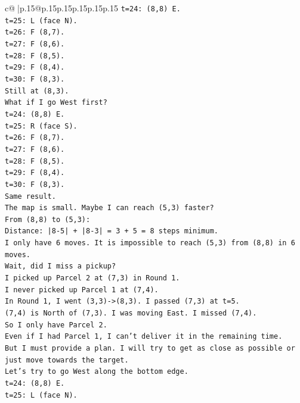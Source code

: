 \documentclass{article}
\begin{document}
{\begin{supertabular}{c@{$\;$}|p{.15\linewidth}@{}p{.15\linewidth}p{.15\linewidth}p{.15\linewidth}p{.15\linewidth}p{.15\linewidth}}
{{{\texttt{t=24: (8,8) E.} \\
\texttt{t=25: L (face N).} \\
\texttt{t=26: F (8,7).} \\
\texttt{t=27: F (8,6).} \\
\texttt{t=28: F (8,5).} \\
\texttt{t=29: F (8,4).} \\
\texttt{t=30: F (8,3).} \\
\texttt{Still at (8,3).} \\
\texttt{What if I go West first?} \\
\texttt{t=24: (8,8) E.} \\
\texttt{t=25: R (face S).} \\
\texttt{t=26: F (8,7).} \\
\texttt{t=27: F (8,6).} \\
\texttt{t=28: F (8,5).} \\
\texttt{t=29: F (8,4).} \\
\texttt{t=30: F (8,3).} \\
\texttt{Same result.} \\
\texttt{The map is small. Maybe I can reach (5,3) faster?} \\
\texttt{From (8,8) to (5,3):} \\
\texttt{Distance: |8{-}5| + |8{-}3| = 3 + 5 = 8 steps minimum.} \\
\texttt{I only have 6 moves. It is impossible to reach (5,3) from (8,8) in 6 moves.} \\
\texttt{Wait, did I miss a pickup?} \\
\texttt{I picked up Parcel 2 at (7,3) in Round 1.} \\
\texttt{I never picked up Parcel 1 at (7,4).} \\
\texttt{In Round 1, I went (3,3){-}>(8,3). I passed (7,3) at t=5.} \\
\texttt{(7,4) is North of (7,3). I was moving East. I missed (7,4).} \\
\texttt{So I only have Parcel 2.} \\
\texttt{Even if I had Parcel 1, I can't deliver it in the remaining time.} \\
\texttt{But I must provide a plan. I will try to get as close as possible or just move towards the target.} \\
\texttt{Let's try to go West along the bottom edge.} \\
\texttt{t=24: (8,8) E.} \\
\texttt{t=25: L (face N).} \\
}}}
\end{supertabular}}
\end{document}
